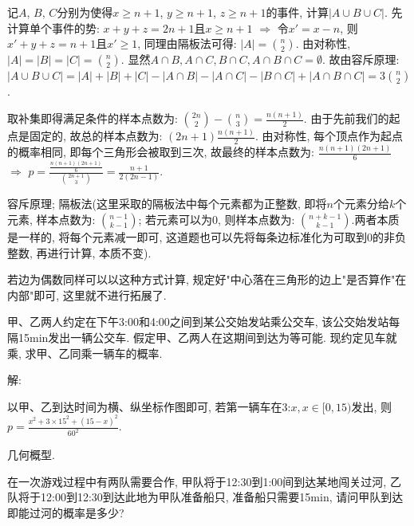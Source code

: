 \documentclass[standard]{ExBook}
\renewenvironment{shaded}{%
  \def\FrameCommand{\fboxsep=\FrameSep \colorbox{shadecolor}}%
  \MakeFramed{\advance\hsize-\width \FrameRestore}%
}{%
  \endMakeFramed
}
\begin{document}
\begin{qitems}
记$A$, $B$, $C$分别为使得$x \geq n+1$, $y \geq n+1$, $z \geq n+1$的事件, 计算$|A\cup B\cup C|$. 先计算单个事件的势: $x+y+z=2n+1$且$x \geq n+1$ $\Longrightarrow$ 令$x'=x-n$, 则$x'+y+z=n+1$且$x' \geq 1$, 同理由隔板法可得: $|A|=\binom{n}{2}$. 由对称性, $|A|=|B|=|C|=\binom{n}{2}$. 显然$A\cap B,A\cap C,B\cap C,A\cap B\cap C=\emptyset$. 故由容斥原理: $|A\cup B\cup C|=|A|+|B|+|C|-|A\cap B|-|A\cap C|-|B\cap C|+|A\cap B\cap C|=3\binom{n}{2}$.

取补集即得满足条件的样本点数为: $\binom{2n}{2}-\binom{n}{3}=\frac{n(n+1)}{2}$. 由于先前我们的起点是固定的, 故总的样本点数为: $(2n+1)\frac{n(n+1)}{2}$. 由对称性, 每个顶点作为起点的概率相同, 即每个三角形会被取到三次, 故最终的样本点数为: $\frac{n(n+1)(2n+1)}{6}$ $\Longrightarrow$ $p=\frac{\frac{n(n+1)(2n+1)}{6}}{\binom{2n+1}{3}}=\frac{n+1}{2(2n-1)}$.

\textcolor{themeColor}{\selectfont {} 容斥原理; 隔板法(这里采取的隔板法中每个元素都为正整数, 即将$n$个元素分给$k$个元素, 样本点数为: $\binom{n-1}{k-1}$; 若元素可以为0, 则样本点数为: $\binom{n+k-1}{k-1}$.两者本质是一样的, 将每个元素减一即可, 这道题也可以先将每条边标准化为可取到0的非负整数, 再进行计算, 本质不变).}

\textcolor{themeColor}{\selectfont {} 若边为偶数同样可以以这种方式计算, 规定好"中心落在三角形的边上"是否算作"在内部"即可, 这里就不进行拓展了.}

\vspace{2.5cm-5em}

    \begin{bbox}
    \begin{shaded}
        \qitem
甲、乙两人约定在下午3:00和4:00之间到某公交始发站乘公交车, 该公交始发站每隔15min发出一辆公交车. 假定甲、乙两人在这期间到达为等可能. 现约定见车就乘, 求甲、乙同乘一辆车的概率.
    \end{shaded}
    \end{bbox}

\vspace{\dimexpr2.5cm-5em\relax}

解: 

以甲、乙到达时间为横、纵坐标作图即可, 若第一辆车在3:$x,x\in[0,15)$发出, 则$p=\frac{x^2+3\times15^2+(15-x)^2}{60^2}$.

\textcolor{themeColor}{\selectfont {} 几何概型.}

\vspace{2.5cm-5em}

    \begin{bbox}
    \begin{shaded}
        \qitem
在一次游戏过程中有两队需要合作, 甲队将于12:30到1:00间到达某地闯关过河, 乙队将于12:00到12:30到达此地为甲队准备船只, 准备船只需要15min, 请问甲队到达即能过河的概率是多少?
    \end{shaded}
    \end{bbox}


\end{qitems}
\end{document}
